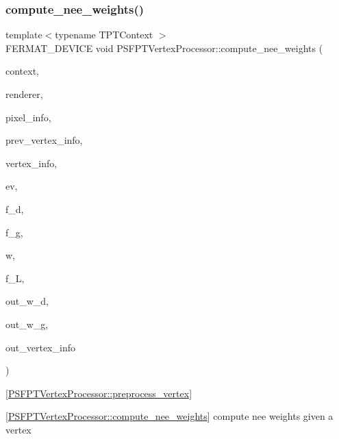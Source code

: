 \subsubsection{\texorpdfstring{compute\+\_\+nee\+\_\+weights()}{compute\_nee\_weights()}}
{\footnotesize\ttfamily template$<$typename T\+P\+T\+Context $>$ \\
F\+E\+R\+M\+A\+T\+\_\+\+D\+E\+V\+I\+CE void P\+S\+F\+P\+T\+Vertex\+Processor\+::compute\+\_\+nee\+\_\+weights (\begin{DoxyParamCaption}\item[{const T\+P\+T\+Context \&}]{context,  }\item[{const \hyperlink{struct_rendering_context_view}{Rendering\+Context\+View} \&}]{renderer,  }\item[{const \hyperlink{union_pixel_info}{Pixel\+Info}}]{pixel\+\_\+info,  }\item[{const uint32}]{prev\+\_\+vertex\+\_\+info,  }\item[{const uint32}]{vertex\+\_\+info,  }\item[{const \hyperlink{struct_eye_vertex}{Eye\+Vertex} \&}]{ev,  }\item[{const \hyperlink{structcugar_1_1_vector}{cugar\+::\+Vector3f} \&}]{f\+\_\+d,  }\item[{const \hyperlink{structcugar_1_1_vector}{cugar\+::\+Vector3f} \&}]{f\+\_\+g,  }\item[{const \hyperlink{structcugar_1_1_vector}{cugar\+::\+Vector3f} \&}]{w,  }\item[{const \hyperlink{structcugar_1_1_vector}{cugar\+::\+Vector3f} \&}]{f\+\_\+L,  }\item[{\hyperlink{structcugar_1_1_vector}{cugar\+::\+Vector3f} \&}]{out\+\_\+w\+\_\+d,  }\item[{\hyperlink{structcugar_1_1_vector}{cugar\+::\+Vector3f} \&}]{out\+\_\+w\+\_\+g,  }\item[{uint32 \&}]{out\+\_\+vertex\+\_\+info }\end{DoxyParamCaption})\hspace{0.3cm}{\ttfamily [inline]}}



\mbox{[}\hyperlink{struct_p_s_f_p_t_vertex_processor_ae26801cfa7d5de8979979419f5edc934}{P\+S\+F\+P\+T\+Vertex\+Processor\+::preprocess\+\_\+vertex}\mbox{]} 

\mbox{[}\hyperlink{struct_p_s_f_p_t_vertex_processor_ad0208c56ea8196913977b3029c14be61}{P\+S\+F\+P\+T\+Vertex\+Processor\+::compute\+\_\+nee\+\_\+weights}\mbox{]} compute nee weights given a vertex


